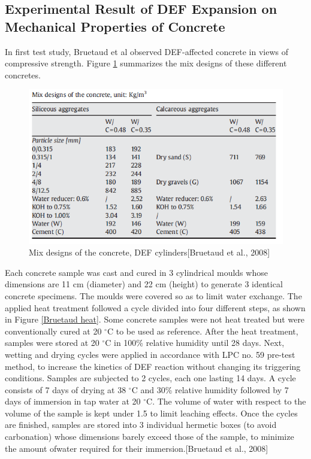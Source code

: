 \clearpage
\subsection{Experimental Result of DEF Expansion on Mechanical Properties of Concrete}

In first test study, Bruetaud et al observed DEF-affected concrete in views of compressive strength. Figure \ref{Bruetaud Mix designs} summarizes the mix designs of these different concretes.

\begin{figure}[h!]
  \centering
  \includegraphics[width=0.8\linewidth]{Reference/Bruetaud1.png}
  \caption{Mix designs of the concrete, DEF cylinders[Bruetaud et al., 2008]}
  \label{Bruetaud Mix designs}
\end{figure}

Each concrete sample was cast and cured in 3 cylindrical moulds whose dimensions are 11 cm (diameter) and 22 cm (height) to generate 3 identical concrete specimens. The moulds were covered so as to limit water exchange. The applied heat treatment followed a cycle divided into four different steps, as shown in Figure \ref{Bruetaud heat}. Some concrete samples were not heat treated but were conventionally cured at 20 $^\circ$C to be used as reference. After the heat treatment, samples were stored at 20 $^\circ$C in 100\% relative humidity until 28 days. Next, wetting and drying cycles were applied in accordance with LPC no. 59 pre-test method, to increase the kinetics of DEF reaction without changing its triggering conditions. Samples are subjected to 2 cycles, each one lasting 14 days. A cycle consists of 7 days of drying at 38 $^\circ$C and 30\% relative humidity followed by 7 days of immersion in tap water at 20 $^\circ$C. The volume of water with respect to the volume of the sample is kept under 1.5 to limit leaching effects. Once the cycles are finished, samples are stored into 3 individual hermetic boxes (to avoid carbonation) whose dimensions barely exceed those of the sample, to minimize the amount ofwater required for their immersion.[Bruetaud et al., 2008]

